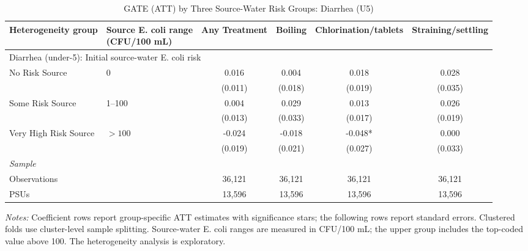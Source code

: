 \begin{landscape}
\begin{table}[p]
\centering
\caption{GATE (ATT) by Three Source-Water Risk Groups: Diarrhea (U5)}
\label{tab:table_gate_main_risk_groups-diarrhea}
\scriptsize\setlength{\tabcolsep}{4pt}
\begin{adjustbox}{max width=\linewidth, center}
\begin{tabular}{llcccc}
\toprule
Heterogeneity group & \shortstack{Source E. coli range\\(CFU/100 mL)} & Any Treatment & Boiling & Chlorination/tablets & Straining/settling \\
\midrule
\multicolumn{6}{l}{Diarrhea (under-5): Initial source-water E. coli risk} \\
No Risk Source & 0 & 0.016 & 0.004 & 0.018 & 0.028 \\
 &  & (0.011) & (0.018) & (0.019) & (0.035) \\
Some Risk Source & 1--100 & 0.004 & 0.029 & 0.013 & 0.026 \\
 &  & (0.013) & (0.033) & (0.017) & (0.019) \\
Very High Risk Source & $>100$ & -0.024 & -0.018 & -0.048* & 0.000 \\
 &  & (0.019) & (0.021) & (0.027) & (0.033) \\
\multicolumn{6}{l}{\textit{Sample}} \\
\quad Observations &  & 36,121 & 36,121 & 36,121 & 36,121 \\
\quad PSUs &  & 13,596 & 13,596 & 13,596 & 13,596 \\
\bottomrule
\end{tabular}
\end{adjustbox}
\par\vspace{3pt}
\begin{minipage}{\linewidth}\footnotesize \textit{Notes:} Coefficient rows report group-specific ATT estimates with significance stars; the following rows report standard errors. Clustered folds use cluster-level sample splitting. Source-water E. coli ranges are measured in CFU/100 mL; the upper group includes the top-coded value above 100. The heterogeneity analysis is exploratory.\end{minipage}
\end{table}
\end{landscape}